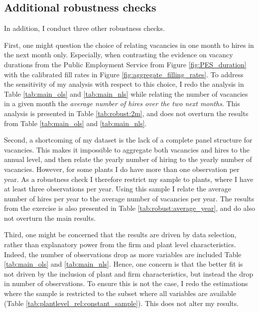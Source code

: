 \subsection{Additional robustness checks}

In addition, I conduct three other robustness checks. 

First, one might question the choice of relating vacancies in one month to hires in the next month only. Especially, when contrasting the evidence on vacancy durations from the Public Employment Service from Figure \ref{fig:PES_duration} with the calibrated fill rates in Figure \ref{fig:aggregate_filling_rates}. To address the sensitivity of my analysis with respect to this choice, I redo the analysis in Table \ref{tab:main_ols} and \ref{tab:main_nls} while relating the number of vacancies in a given month the \emph{average number of hires over the two next months}. This analysis is presented in Table \ref{tab:robust:2m}, and does not overturn the results from Table \ref{tab:main_ols} and \ref{tab:main_nls}.

Second, a shortcoming of my dataset is the lack of a complete panel structure for vacancies. This makes it impossible to aggregate both vacancies and hires to the annual level, and then relate the yearly number of hiring to the yearly number of vacancies. However, for some plants I do have more than one observation per year. As a robustness check I therefore restrict my sample to plants, where I have at least three observations per year. Using this sample I relate the average number of hires per year to the average number of vacancies per year. The results from the exercise is also presented in Table \ref{tab:robust:average_year}, and do also not overturn the main results.

Third, one might be concerned that the results are driven by data selection, rather than explanatory power from the firm and plant level characteristics. Indeed, the number of observations drop as more variables are included Table \ref{tab:main_ols} and \ref{tab:main_nls}. Hence, one concern is that the better fit is not driven by the inclusion of  plant and firm characteristics, but instead the drop in number of observations. To ensure this is not the case, I redo the estimations where the sample is restricted to the subset where all variables are available (Table \ref{tab:plantlevel_rel:constant_sample}). This does not alter my results. 